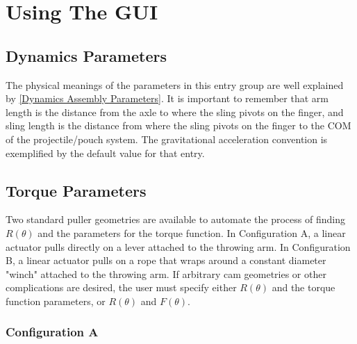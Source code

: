 \documentclass{article}
\begin{document}
\section{Using The GUI}

\subsection{Dynamics Parameters}
The physical meanings of the parameters in this entry group are well explained by \ref{Dynamics Assembly Parameters}. It is important to remember that arm length is the distance from the axle to where the sling pivots on the finger, and sling length is the distance from where the sling pivots on the finger to the COM of the projectile/pouch system. The gravitational acceleration convention is exemplified by the default value for that entry.

\subsection{Torque Parameters}
Two standard puller geometries are available to automate the process of finding $R(\theta)$ and the parameters for the torque function. In Configuration A, a linear actuator pulls directly on a lever attached to the throwing arm. In Configuration B, a linear actuator pulls on a rope that wraps around a constant diameter "winch" attached to the throwing arm. If arbitrary cam geometries or other complications are desired, the user must specify either $R(\theta)$ and the torque function parameters, or $R(\theta)$ and $F(\theta)$.

\subsubsection{Configuration A}
\end{document}
